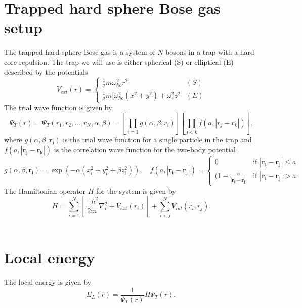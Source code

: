 \section{Trapped hard sphere Bose gas setup}
\label{sec:Trapped hard sphere Bose gas setup}
The trapped hard sphere Bose gas is a system of $N$ bosons in a trap with a hard core repulsion.
The trap we will use is either spherical (S) or elliptical (E) described by the potentials
\begin{equation}
\label{eq:extpotential}
V _{ext}(r) = 
{
	\left\{
		\begin{array}{lll}
			\frac{1}{2}m \omega _{ho}^2r^2 & (S)  \\
			\frac{1}{2}m[\omega _{ho}^2(x^2+y^2)+\omega _z^2z^2 & (E) 
		\end{array}
	\right.
}
\end{equation}
The trial wave function is given by
\begin{equation}
	\Psi _T(r) = \Psi _T(r_1, r_2, ..., r_N, \alpha , \beta ) = \left[\prod _{i=1}g(\alpha , \beta , r_i)\right]\left[\prod_{j<k}^{} f(a, |r_j-r_k|)\right],  
\end{equation}
where $g(\alpha , \beta , \boldsymbol{r_i})$ is the trial wave function for a single particle in the trap and $f(a, |\boldsymbol{r_j}-\boldsymbol{r_k}|)$ is the correlation wave function for the two-body potential 
\begin{equation}
g(\alpha, \beta , \boldsymbol{r_i}) = \exp(-\alpha (x_i^2 + y_i^2 + \beta z_i^2)), \quad f(a,|\boldsymbol{r_i}-\boldsymbol{r_j}|)=
{
	\left\{
		\begin{array}{lll}
			0 & \mbox{if } |\boldsymbol{r_i}-\boldsymbol{r_j}| \le a \\
			(1-\frac{a}{|\boldsymbol{r_i}-\boldsymbol{r_j}|} & \mbox{if } |\boldsymbol{r_i}-\boldsymbol{r_j}|>a. 
		\end{array}
	\right.
}
\end{equation}
The Hamiltonian operator $H$ for the system is given by 
\begin{equation}
\label{eq:Hamiltonian operator}
H = \sum_{i=1}^{N} [\frac{-\hbar^2}{2m} \nabla_i^2 + V _{ext}(r_i)] + \sum_{i<j}^{N} V _{int}(r_i,r_j).
\end{equation}
\
\section{Local energy} %
\label{sec:Local energy}
The local energy is given by 
\begin{equation}
\label{eq:local energy}
E_L(r) = \frac{1}{\Psi _T(r)}H\Psi _T(r),
\end{equation}
